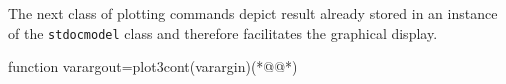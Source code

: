 The next class of plotting commands depict result already stored in an instance of the \lstinline+stdocmodel+ class and therefore facilitates the graphical display.
\begin{matlab}
function varargout=plot3cont(varargin)(*@@*)
%
%
%
% 
%
%
%
%
\end{matlab}
